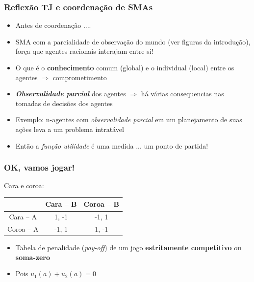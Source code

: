 \begin{frame}
\frametitle{Reflexão TJ e coordenação de SMAs}

\begin{itemize}
  \item Antes de coordenação ....
  \item SMA com a parcialidade de observação do mundo (ver figuras da introdução),
  força que agentes racionais interajam entre si!
  \item O que é o \textbf{conhecimento} comum (global) e o individual (local) entre os agentes $\Rightarrow $ comprometimento
  \item \textbf{\textit{Observalidade parcial}} dos agentes $\Rightarrow $ há várias consequencias nas tomadas de decisões dos agentes
  \item Exemplo: n-agentes com \textit{observalidade parcial} em um planejamento 
  de suas ações leva a um problema intratável
  \item Então a \textit{função utilidade} é uma medida ... um ponto de partida!
  
\end{itemize}

\end{frame}


\begin{frame}
\frametitle{OK, vamos jogar!}

 Cara e coroa:

    \begin{center}
      \begin{tabular}{c||c|c}
                 & Cara -- B & Coroa -- B \\ \hline \hline
      Cara -- A   & 1, -1     &  -1, 1      \\ \hline
      Coroa -- A   & -1, 1   & 1, -1         \\ \hline \hline
      \end{tabular}
    \end{center}

\pause 

\begin{itemize}
  \item Tabela de penalidade (\textit{pay-off}) de um jogo \textbf{estritamente competitivo} ou \textbf{soma-zero}
 \item Pois $u_1(a) + u_2(a) = 0$
\end{itemize}

\end{frame}

